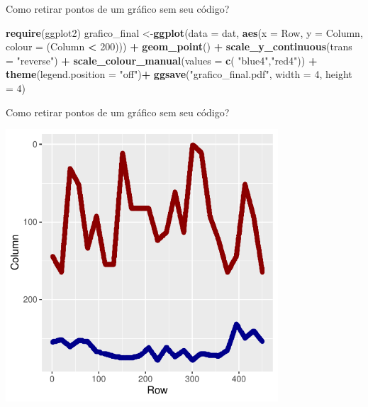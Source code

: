 \documentclass[
  ignorenonframetext,
]{beamer}
\newenvironment{Shaded}{\begin{snugshade}}{\end{snugshade}}
\newcommand{\DataTypeTok}[1]{\textcolor[rgb]{0.13,0.29,0.53}{#1}}
\newcommand{\DecValTok}[1]{\textcolor[rgb]{0.00,0.00,0.81}{#1}}
\newcommand{\KeywordTok}[1]{\textcolor[rgb]{0.13,0.29,0.53}{\textbf{#1}}}
\newcommand{\NormalTok}[1]{#1}
\newcommand{\OperatorTok}[1]{\textcolor[rgb]{0.81,0.36,0.00}{\textbf{#1}}}
\newcommand{\StringTok}[1]{\textcolor[rgb]{0.31,0.60,0.02}{#1}}
\begin{document}
\begin{frame}[fragile]{Como retirar pontos de um gráfico sem seu
código?}
\protect\hypertarget{como-retirar-pontos-de-um-gruxe1fico-sem-seu-cuxf3digo-6}{}

\small

\begin{Shaded}
\begin{Highlighting}[]
\KeywordTok{require}\NormalTok{(ggplot2)}
\NormalTok{grafico_final <-}\KeywordTok{ggplot}\NormalTok{(}\DataTypeTok{data =}\NormalTok{ dat,}
                       \KeywordTok{aes}\NormalTok{(}\DataTypeTok{x =}\NormalTok{ Row,}
                           \DataTypeTok{y =}\NormalTok{ Column,}
                           \DataTypeTok{colour =}\NormalTok{ (Column }\OperatorTok{<}\StringTok{ }\DecValTok{200}\NormalTok{))) }\OperatorTok{+}
\StringTok{    }\KeywordTok{geom_point}\NormalTok{() }\OperatorTok{+}
\StringTok{    }\KeywordTok{scale_y_continuous}\NormalTok{(}\DataTypeTok{trans =} \StringTok{"reverse"}\NormalTok{) }\OperatorTok{+}
\StringTok{    }\KeywordTok{scale_colour_manual}\NormalTok{(}\DataTypeTok{values =} \KeywordTok{c}\NormalTok{( }\StringTok{"blue4"}\NormalTok{,}\StringTok{"red4"}\NormalTok{)) }\OperatorTok{+}
\StringTok{    }\KeywordTok{theme}\NormalTok{(}\DataTypeTok{legend.position =} \StringTok{"off"}\NormalTok{)}\OperatorTok{+}
\StringTok{  }\KeywordTok{ggsave}\NormalTok{(}\StringTok{"grafico_final.pdf"}\NormalTok{, }\DataTypeTok{width =} \DecValTok{4}\NormalTok{, }\DataTypeTok{height =} \DecValTok{4}\NormalTok{)}
\end{Highlighting}
\end{Shaded}

\end{frame}

\begin{frame}{Como retirar pontos de um gráfico sem seu código?}
\protect\hypertarget{como-retirar-pontos-de-um-gruxe1fico-sem-seu-cuxf3digo-7}{}

\small

\includegraphics[width=4.0in]{IMAGENS/grafico_final}

\begin{center}
\tiny{}
\end{center}

\end{frame}
\end{document}

